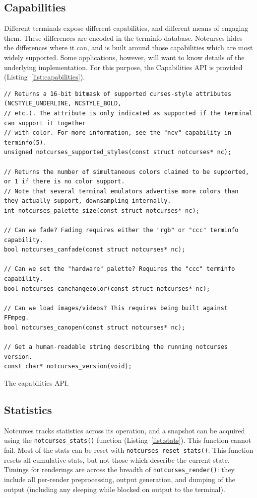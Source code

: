 \documentclass[letterpaper,10pt]{article}
\begin{document}
\subsection{Capabilities}
\label{sec:capabilities}
Different terminals expose different capabilities, and different means of
engaging them. These differences are encoded in the terminfo database\cite{terminfo}.
Notcurses hides the differences where it can, and is built around those
capabilities which are most widely supported. Some applications, however, will
want to know details of the underlying implementation. For this purpose, the
Capabilities API is provided (Listing~\ref{list:capabilities}).
\begin{listing}[!htb]
\begin{verbatim}
// Returns a 16-bit bitmask of supported curses-style attributes (NCSTYLE_UNDERLINE, NCSTYLE_BOLD,
// etc.). The attribute is only indicated as supported if the terminal can support it together
// with color. For more information, see the "ncv" capability in terminfo(5).
unsigned notcurses_supported_styles(const struct notcurses* nc);

// Returns the number of simultaneous colors claimed to be supported, or 1 if there is no color support.
// Note that several terminal emulators advertise more colors than they actually support, downsampling internally.
int notcurses_palette_size(const struct notcurses* nc);

// Can we fade? Fading requires either the "rgb" or "ccc" terminfo capability.
bool notcurses_canfade(const struct notcurses* nc);

// Can we set the "hardware" palette? Requires the "ccc" terminfo capability.
bool notcurses_canchangecolor(const struct notcurses* nc);

// Can we load images/videos? This requires being built against FFmpeg.
bool notcurses_canopen(const struct notcurses* nc);

// Get a human-readable string describing the running notcurses version.
const char* notcurses_version(void);
\end{verbatim}
\caption{The capabilities API.}
\label{list:capabilities}
\end{listing}

\subsection{Statistics}
Notcurses tracks statistics across its operation, and a snapshot can be
acquired using the \texttt{notcurses\_stats()} function (Listing~\ref{list:stats}). This function cannot
fail. Most of the stats can be reset with \texttt{notcurses\_reset\_stats()}.
This function resets all cumulative stats, but not those which describe the
current state. Timings for renderings are across the breadth of
\texttt{notcurses\_render()}: they include all per-render preprocessing, output
generation, and dumping of the output (including any sleeping while blocked on
output to the terminal).
\end{document}
